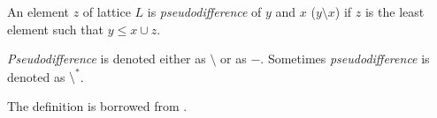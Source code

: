 \documentclass[12pt]{article}
\begin{document}
An element $z$ of lattice $L$ is \emph{pseudodifference} of $y$ and $x$ ($y\setminus x$) if $z$ is the least element such that $y\le x\cup z$.

\emph{Pseudodifference} is denoted either as $\setminus$ or as $-$. Sometimes \emph{pseudodifference} is denoted as $\setminus^*$.

The definition is borrowed from .
\end{document}
